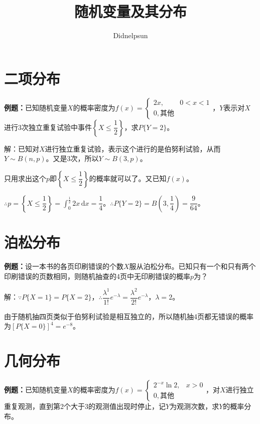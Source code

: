 \documentclass[UTF8, 12pt]{ctexart}
\author{Didnelpsun}
\title{随机变量及其分布}
\date{}
\begin{document}
\maketitle
\pagestyle{empty}
\thispagestyle{empty}
\tableofcontents
\thispagestyle{empty}
\newpage
\pagestyle{plain}
\setcounter{page}{1}

\section{二项分布}

\textbf{例题：}已知随机变量$X$的概率密度为$f(x)=\left\{\begin{array}{ll}
    2x, & 0<x<1 \\
    0, \text{其他}
\end{array}\right.$，$Y$表示对$X$进行3次独立重复试验中事件$\left\{X\leqslant\dfrac{1}{2}\right\}$，求$P\{Y=2\}$。\medskip

解：已知对$X$进行独立重复试验，表示这个进行的是伯努利试验，从而$Y\sim B(n,p)$。又是3次，所以$Y\sim B(3,p)$。

只用求出这个$p$即$\left\{X\leqslant\dfrac{1}{2}\right\}$的概率就可以了。又已知$f(x)$。

$\therefore p=\left\{X\leqslant\dfrac{1}{2}\right\}=\int_0^\frac{1}{2}2x\,\textrm{d}x=\dfrac{1}{4}$。$\therefore P\{Y=2\}=B\left(3,\dfrac{1}{4}\right)=\dfrac{9}{64}$。

\section{泊松分布}

\textbf{例题：}设一本书的各页印刷错误的个数$X$服从泊松分布。已知只有一个和只有两个印刷错误的页数相同，则随机抽查的4页中无印刷错误的概率$p$为？

解：$\because P\{X=1\}=P\{X=2\}$，$\therefore\dfrac{\lambda^1}{1!}e^{-\lambda}=\dfrac{\lambda^2}{2!}e^{-\lambda}$，$\lambda=2$。

由于随机抽四页类似于伯努利试验是相互独立的，所以随机抽4页都无错误的概率为$[P\{X=0\}]^4=e^{-8}$。

\section{几何分布}

\textbf{例题：}已知随机变量$X$的概率密度为$f(x)=\left\{\begin{array}{ll}
    2^{-x}\ln2, & x>0 \\
    0, \text{其他}
\end{array}\right.$，对$X$进行独立重复观测，直到第2个大于3的观测值出现时停止，记$Y$为观测次数，求$Y$的概率分布。
\end{document}
